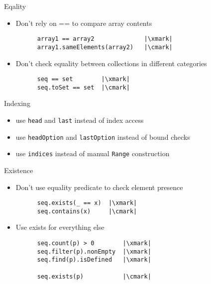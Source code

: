 \documentclass[aspectratio=169]{beamer}
\begin{document}
\begin{frame}[fragile]{Eqality}
  \begin{itemize}
    \item Don’t rely on == to compare array contents \\
      \begin{verbatim}
      array1 == array2              |\xmark|
      array1.sameElements(array2)   |\cmark|
      \end{verbatim}
      \pause
    \item Don’t check equality between collections in different categories \\
      \begin{verbatim}
      seq == set        |\xmark|
      seq.toSet == set  |\cmark|
      \end{verbatim}
  \end{itemize}
\end{frame}

\begin{frame}[fragile]{Indexing}
  \begin{itemize}
    \item use \texttt{head} and \texttt{last} instead of index access
      \pause
    \item use \texttt{headOption} and \texttt{lastOption} instead of bound checks
      \pause
    \item use \texttt{indices} instead of manual \texttt{Range} construction
  \end{itemize}
\end{frame}

\begin{frame}[fragile]{Existence}
  \begin{itemize}
    \item Don’t use equality predicate to check element presence \\
      \begin{verbatim}
      seq.exists(_ == x)  |\xmark|
      seq.contains(x)     |\cmark|
      \end{verbatim}
      \pause
    \item Use exists for everything else \\
      \begin{verbatim}
      seq.count(p) > 0        |\xmark|
      seq.filter(p).nonEmpty  |\xmark|
      seq.find(p).isDefined   |\xmark|

      seq.exists(p)           |\cmark|
      \end{verbatim}
  \end{itemize} 
\end{frame}
\end{document}
